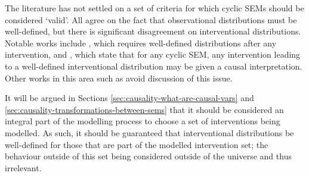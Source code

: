 
The literature has not settled on a set of criteria for which cyclic SEMs should be considered `valid'. 
All agree on the fact that observational distributions must be well-defined, but there is significant disagreement on interventional distributions.
Notable works include \cite{hyttinen2010causal}, which requires well-defined distributions after any intervention, and \cite{mooij2011causal}, which state that for any cyclic SEM, any intervention leading to a well-defined interventional distribution may be given a causal interpretation. Other works in this area such as \cite{lacerda2012discovering} avoid discussion of this issue.

It will be argued in Sections \ref{sec:causality-what-are-causal-vars} and \ref{sec:causality-transformations-between-sems} that it should be considered an integral part of the modelling process to choose a set of interventions being modelled. As such, it should be guaranteed that interventional distributions be well-defined for those that are part of the modelled intervention set; the behaviour outside of this set being considered outside of the universe and thus irrelevant.


